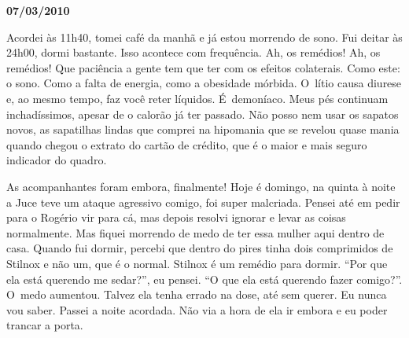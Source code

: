 \begin{center}\textbf{\asterisc{}}\end{center}


\begin{flushright}\textbf{07/03/2010}\end{flushright}


Acordei às 11h40, tomei café da manhã e já estou morrendo de sono. Fui
deitar às 24h00, dormi bastante. Isso acontece com frequência. Ah, os
remédios! Ah, os remédios! Que paciência a gente tem que ter com os
efeitos colaterais. Como este: o sono. Como a falta de energia, como a
obesidade mórbida. O~lítio causa diurese e, ao mesmo tempo, faz você
reter líquidos. É~demoníaco. Meus pés continuam inchadíssimos, apesar de
o calorão já ter passado. Não posso nem usar os sapatos novos, as
sapatilhas lindas que comprei na hipomania que se revelou quase mania
quando chegou o extrato do cartão de crédito, que é o maior e mais
seguro indicador do quadro.

As acompanhantes foram embora, finalmente! Hoje é domingo, na quinta à
noite a Juce teve um ataque agressivo comigo, foi super malcriada.
Pensei até em pedir para o Rogério vir para cá, mas depois resolvi
ignorar e levar as coisas normalmente. Mas fiquei morrendo de medo de
ter essa mulher aqui dentro de casa. Quando fui dormir, percebi que
dentro do pires tinha dois comprimidos de Stilnox e não um, que é o
normal. Stilnox é um remédio para dormir. ``Por que ela está querendo me
sedar?'', eu pensei. ``O que ela está querendo fazer comigo?''. O~medo
aumentou. Talvez ela tenha errado na dose, até sem querer. Eu nunca vou
saber. Passei a noite acordada. Não via a hora de ela ir embora e eu
poder trancar a porta.


